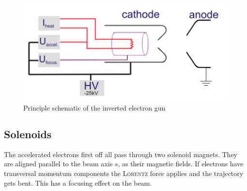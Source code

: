 \documentclass[11pt,a4paper,notitlepage]{scrartcl}
\begin{document}
\begin{figure}
	\centering
	\includegraphics[width=0.6\linewidth]{figs/electron_gun.png}
	\caption{Principle schematic of the inverted electron gun \cite{script}}\label{fig:gun}
\end{figure}
\subsection{Solenoids}
The accelerated electrons first off all pass through two solenoid magnets. They are aligned parallel to the beam axis $s$, as their magnetic fields. If electrons have transversal momentum components the \textsc{Lorentz} force applies and the trajectory gets bent. This has a focusing effect on the beam.
\newpage
\end{document}
